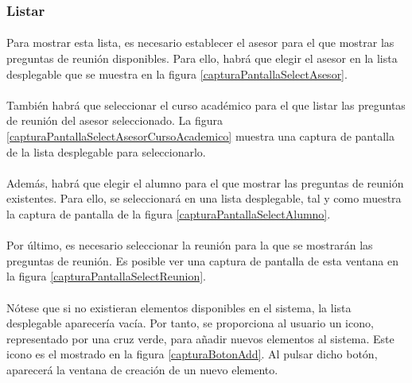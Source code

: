 \subsubsection{Listar}

  \paragraph{}Para mostrar esta lista, es necesario establecer el asesor para
  el que mostrar las preguntas de reunión disponibles. Para ello, habrá que
  elegir el asesor en la lista desplegable que se muestra en la figura
  \ref{capturaPantallaSelectAsesor}.

  \paragraph{}También habrá que seleccionar el curso académico para el que
  listar las preguntas de reunión del asesor seleccionado. La figura
  \ref{capturaPantallaSelectAsesorCursoAcademico} muestra una captura de
  pantalla de la lista desplegable para seleccionarlo.

  \paragraph{}Además, habrá que elegir el alumno para el que mostrar las
  preguntas de reunión existentes. Para ello, se seleccionará en una lista
  desplegable, tal y como muestra la captura de pantalla de la figura
  \ref{capturaPantallaSelectAlumno}.

  \paragraph{}Por último, es necesario seleccionar la reunión para la que se
  mostrarán las preguntas de reunión. Es posible ver una captura de pantalla
  de esta ventana en la figura \ref{capturaPantallaSelectReunion}.

  \paragraph{}Nótese que si no existieran elementos disponibles en el sistema,
  la lista desplegable aparecería vacía. Por tanto, se proporciona al usuario
  un icono, representado por una cruz verde, para añadir nuevos elementos al
  sistema. Este icono es el mostrado en la figura \ref{capturaBotonAdd}. Al
  pulsar dicho botón, aparecerá la ventana de creación de un nuevo elemento.


